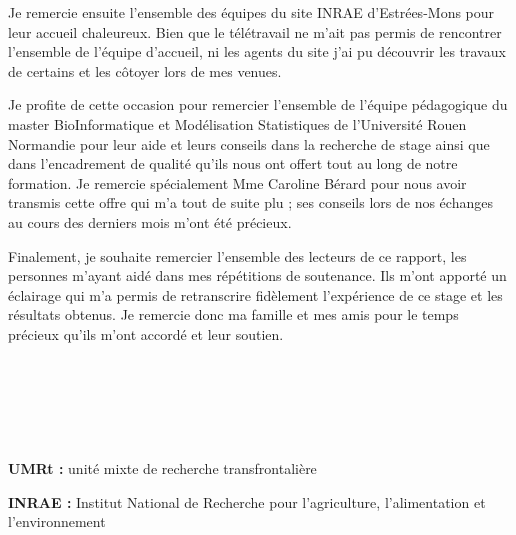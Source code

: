 \documentclass[twoside]{article}
\begin{document}
\vspace{0.5cm}Je remercie ensuite l'ensemble des équipes du site INRAE d'Estrées-Mons pour leur accueil chaleureux. Bien que le télétravail ne m'ait pas permis de rencontrer l'ensemble de l'équipe d'accueil, ni les agents du site j'ai pu découvrir les travaux de certains et les côtoyer lors de mes venues. 

\vspace{0.5cm}Je profite de cette occasion pour remercier l'ensemble de l'équipe pédagogique du master BioInformatique et Modélisation Statistiques de l'Université Rouen Normandie pour leur aide et leurs conseils dans la recherche de stage ainsi que dans l'encadrement de qualité qu'ils nous ont offert tout au long de notre formation. Je remercie spécialement Mme Caroline Bérard pour nous avoir transmis cette offre qui m'a tout de suite plu ; ses conseils lors de nos échanges au cours des derniers mois m'ont été précieux.

\vspace{0.5cm}Finalement, je souhaite remercier l'ensemble des lecteurs de ce rapport, les personnes m'ayant aidé dans mes répétitions de soutenance. Ils m'ont apporté un éclairage qui m'a permis de retranscrire fidèlement l'expérience de ce stage et les résultats obtenus. Je remercie donc ma famille et mes amis pour le temps précieux qu'ils m'ont accordé et leur soutien.

\newpage
\thispagestyle{empty}
~

\newpage
\addtocounter{section}{1}
\tableofcontents\thispagestyle{fancy}

\newpage
\thispagestyle{empty}
~

\newpage
\thispagestyle{fancy}
\addtocounter{section}{1}
\listoffigures

\listoftables

\newpage

\newpage
\newpage
\thispagestyle{empty}
~

\newpage
{}

\vspace{1cm}\textbf{UMRt : }unité mixte de recherche transfrontalière

\vspace{0.5cm}\textbf{INRAE : }Institut National de Recherche pour l'agriculture, l'alimentation et l'environnement
\end{document}
